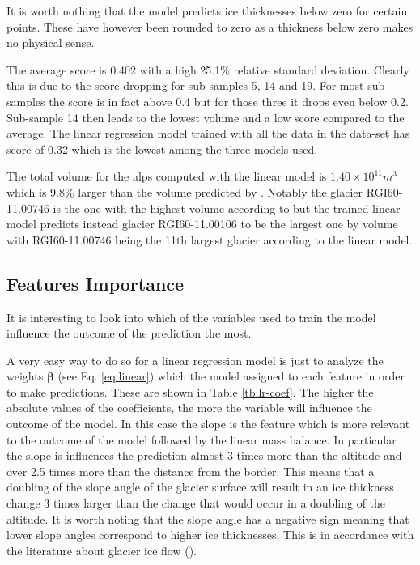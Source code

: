 It is worth nothing that the model predicts ice thicknesses below zero for certain points. These have however been rounded to zero as a thickness below zero makes no physical sense.

The average score is 0.402 with a high 25.1\% relative standard deviation. Clearly this is due to the score dropping for sub-samples 5, 14 and 19. For most sub-samples the score is in fact above 0.4 but for those three it drops even below 0.2. Sub-sample 14 then leads to the lowest volume and a low score compared to the average.
The linear regression model trained with all the data in the data-set has score of 0.32 which  is the lowest among the three models used.

The total volume for the alps computed with the linear model is $1.40 \times 10^{11}m^3$ which is 9.8\% larger than the volume predicted by \citet{Farinotti2019}. Notably the glacier RGI60-11.00746 is the one with the highest volume according to \citet{Farinotti2019} but  the trained linear model predicts instead glacier RGI60-11.00106 to be the largest one by volume with RGI60-11.00746 being the 11th largest glacier according to the linear model.

\subsection{Features Importance}  

It is interesting to look into which of the variables used to train the model influence the outcome of the prediction the most.

A very easy way to do so for a linear regression model is just to analyze the weights $\bm{\beta}$ (see Eq. \ref{eq:linear}) which the model assigned to each feature in order to make predictions. These are shown in Table \ref{tb:lr-coef}.
The higher the absolute values of the coefficients, the more the variable will influence the outcome of the model. In this case the slope is the feature which is more relevant to the outcome of the model followed by the linear mass balance. In particular the slope is influences the prediction almost 3 times more than the altitude and over 2.5 times more than the distance from the border. This means that a doubling of the slope angle of the glacier surface will result in an ice thickness change 3 times larger than the change that would occur in a doubling of the altitude. It is worth noting that the slope angle has a negative sign meaning that lower slope angles correspond to higher ice thicknesses. This is in accordance with the literature about glacier ice flow (\cite[P. 298]{cuffey2010physics}).

